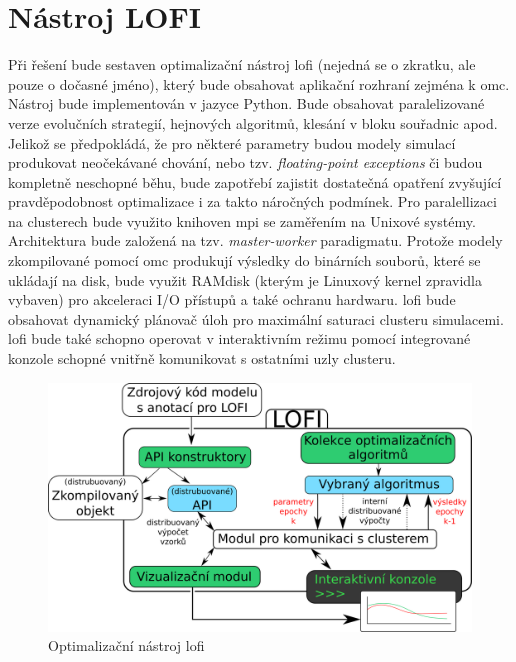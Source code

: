 \section{Nástroj LOFI}
\label{sec:tool_LOFI}
Při řešení bude sestaven optimalizační nástroj \acrshort{lofi} (nejedná se o
zkratku, ale pouze o dočasné jméno), který bude obsahovat aplikační rozhraní
zejména k \acrshort{omc}. Nástroj bude implementován v jazyce Python. Bude
obsahovat paralelizované verze evolučních strategií, hejnových algoritmů,
klesání v bloku souřadnic apod. Jelikož se předpokládá, že pro některé
parametry budou modely simulací produkovat neočekávané chování, nebo tzv.
\textit{floating-point exceptions} či budou kompletně neschopné běhu, bude
zapotřebí zajistit dostatečná opatření zvyšující pravděpodobnost optimalizace i
za takto náročných podmínek. Pro paralellizaci na clusterech bude využito
knihoven \acrshort{mpi} se zaměřením na Unixové systémy. Architektura bude
založená na tzv. \textit{master-worker} paradigmatu. Protože modely
zkompilované pomocí \acrshort{omc} produkují výsledky do binárních souborů,
které se ukládají na disk, bude využit RAMdisk (kterým je Linuxový kernel
zpravidla vybaven) pro akceleraci I/O přístupů a také ochranu hardwaru.
\acrshort{lofi} bude obsahovat dynamický plánovač úloh pro maximální saturaci
clusteru simulacemi. \acrshort{lofi} bude také schopno operovat v interaktivním
režimu pomocí integrované konzole schopné vnitřně komunikovat s ostatními uzly
clusteru.
\begin{figure}[h]\centering
  \includegraphics[scale=0.75]{figures/LofiArchitecture}
\caption{Optimalizační nástroj \acrshort{lofi}}
\label{fig:LOFI}
\end{figure}


